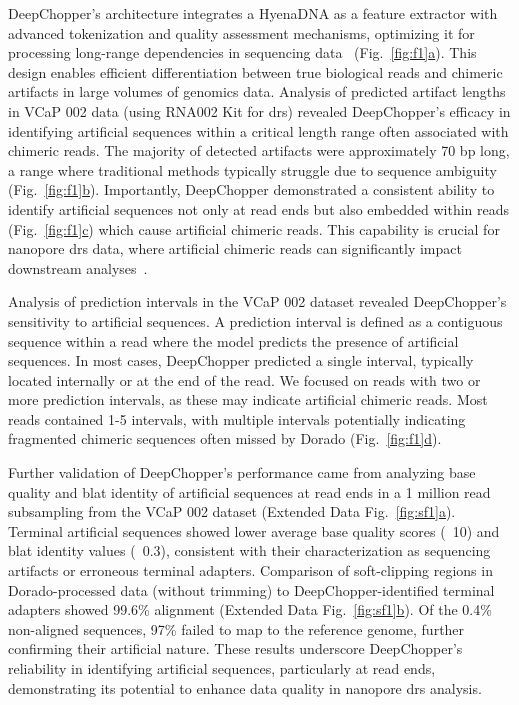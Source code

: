 \documentclass[pdflatex, sn-mathphys-num, lineno]{sn-jnl}%
\newcommand{\figref}[2]{Fig.~\hyperref[#1]{\ref*{#1}#2}}
\newcommand{\edfigref}[2]{Extended Data Fig.~\hyperref[#1]{\ref*{#1}#2}}
\theoremstyle{thmstyleone}%
\theoremstyle{thmstyletwo}%
\theoremstyle{thmstylethree}%
\begin{document}
DeepChopper's architecture integrates a HyenaDNA as a feature extractor with advanced tokenization and quality assessment mechanisms, optimizing it for processing long-range dependencies in sequencing data~\cite{nguyen2024hyenadna} (\figref{fig:f1}{a}).
This design enables efficient differentiation between true biological reads and chimeric artifacts in large volumes of genomics data.
Analysis of predicted artifact lengths in VCaP 002 data (using RNA002 Kit for \gls{drs}) revealed DeepChopper's efficacy in identifying artificial sequences within a critical length range often associated with chimeric reads.
The majority of detected artifacts were approximately 70 bp long, a range where traditional methods typically struggle due to sequence ambiguity (\figref{fig:f1}{b}).
Importantly, DeepChopper demonstrated a consistent ability to identify artificial sequences not only at read ends but also embedded within reads (\figref{fig:f1}{c}) which cause artificial chimeric reads.
This capability is crucial for nanopore \gls{drs} data, where artificial chimeric reads can significantly impact downstream analyses~\cite{smith2020molecular}.

Analysis of prediction intervals in the VCaP 002 dataset revealed DeepChopper's sensitivity to artificial sequences.
A prediction interval is defined as a contiguous sequence within a read where the model predicts the presence of artificial sequences.
In most cases, DeepChopper predicted a single interval, typically located internally or at the end of the read.
We focused on reads with two or more prediction intervals, as these may indicate artificial chimeric reads.
Most reads contained 1-5 intervals, with multiple intervals potentially indicating fragmented chimeric sequences often missed by Dorado (\figref{fig:f1}{d}).

Further validation of DeepChopper's performance came from analyzing base quality and \gls{blat} identity of artificial sequences at read ends in a 1 million read subsampling from the VCaP 002 dataset (\edfigref{fig:sf1}{a}).
Terminal artificial sequences showed lower average base quality scores (~10) and \gls{blat} identity values (~0.3), consistent with their characterization as sequencing artifacts or erroneous terminal adapters.
Comparison of soft-clipping regions in Dorado-processed data (without trimming) to DeepChopper-identified terminal adapters showed 99.6\% alignment (\edfigref{fig:sf1}{b}).
Of the 0.4\% non-aligned sequences, 97\% failed to map to the reference genome, further confirming their artificial nature.
These results underscore DeepChopper's reliability in identifying artificial sequences, particularly at read ends, demonstrating its potential to enhance data quality in nanopore \gls{drs} analysis.
\end{document}
